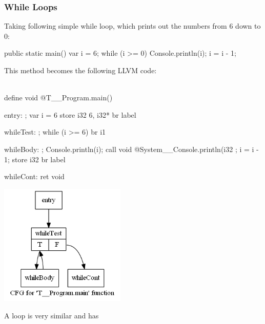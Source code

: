 \documentclass{article}
\newcommand{\bt}{\ensuremath{^{\backprime}}}
\newcommand{\code}[1]{\texttt{\StrSubstitute{#1}{`}{\bt}}}
\newcommand{\bcode}[1]{\code{#1}}
\begin{document}
\subsubsection{While Loops}
Taking following simple while loop, which prints out the numbers from 6 down to 0:
\begin{sooplisting}
public static main() {
	var i = 6;
	while (i >= 0) {
		Console.println(i);
		i = i - 1;
	}
}
\end{sooplisting}
This method becomes the following LLVM code:
\\\\
\begin{minipage}{0.62\textwidth}
\begin{llvmlisting}
define void @T__Program.main() {
entry:
  ; var i = 6
  store i32 6, i32* %
  br label %

whileTest:
  ; while (i >= 6)
  br i1 %

whileBody:
  ; Console.println(i);
  call void @System__Console.println(i32 %
  ; i = i - 1;
  store i32 %
  br label %

whileCont:
  ret void
}
\end{llvmlisting}
\end{minipage}
\begin{minipage}{0.38\textwidth}
\includegraphics[width=6cm]{while_cfg_small}
\end{minipage}
A \bcode{for} loop is very similar and has 
\end{document}
